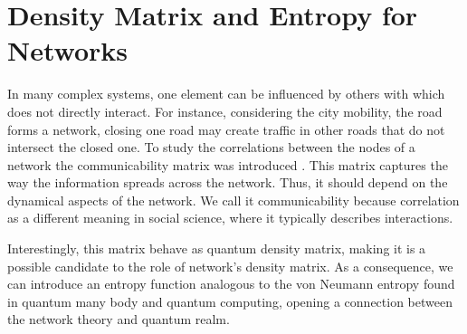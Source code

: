 \chapter{Density Matrix and Entropy for Networks}\label{C_Density_Matrix}

In many complex systems, one element can be influenced by others with which does not directly interact. For instance, considering the city mobility, the road forms a network, closing one road may create traffic in other roads that do not intersect the closed one. To study the correlations between the nodes of a network the communicability matrix was introduced \cite{Estrada_2008}. 
This matrix captures the way the information spreads across the network. Thus, it should depend on the dynamical aspects of the network.
We call it communicability because correlation as a different meaning in social science, where it typically describes interactions.

Interestingly, this matrix behave as quantum density matrix, making it is a possible candidate to the role of network's density matrix. As a consequence, we can introduce an entropy function analogous to the von Neumann entropy found in quantum many body and quantum computing, opening a connection between the network theory and quantum realm.




